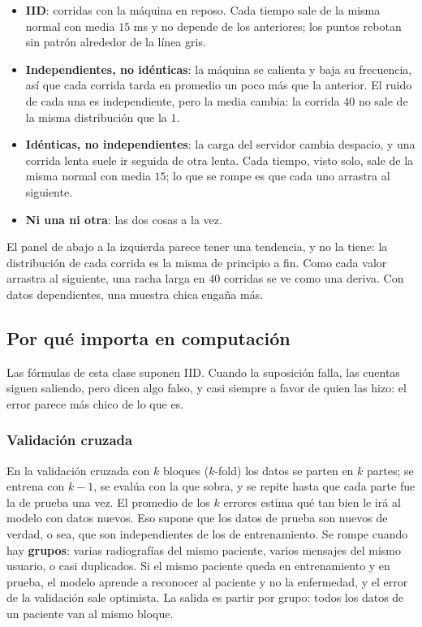 \documentclass[11pt,letterpaper]{article}
\begin{document}
\begin{itemize}[itemsep=0.3em]
    \item \textbf{IID}: corridas con la máquina en reposo. Cada tiempo
          sale de la misma normal con media $15$ ms y no depende de los
          anteriores; los puntos rebotan sin patrón alrededor de la
          línea gris.
    \item \textbf{Independientes, no idénticas}: la máquina se calienta
          y baja su frecuencia, así que cada corrida tarda en promedio
          un poco más que la anterior. El ruido de cada una es
          independiente, pero la media cambia: la corrida $40$ no sale
          de la misma distribución que la $1$.
    \item \textbf{Idénticas, no independientes}: la carga del servidor
          cambia despacio, y una corrida lenta suele ir seguida de otra
          lenta. Cada tiempo, visto solo, sale de la misma normal con
          media $15$; lo que se rompe es que cada uno arrastra al
          siguiente.
    \item \textbf{Ni una ni otra}: las dos cosas a la vez.
\end{itemize}

\begin{ojo}
    El panel de abajo a la izquierda parece tener una tendencia, y no
    la tiene: la distribución de cada corrida es la misma de principio
    a fin. Como cada valor arrastra al siguiente, una racha larga en
    $40$ corridas se ve como una deriva. Con datos dependientes, una
    muestra chica engaña más.
\end{ojo}


\subsection*{Por qué importa en computación}

Las fórmulas de esta clase suponen IID. Cuando la suposición falla,
las cuentas siguen saliendo, pero dicen algo falso, y casi siempre a
favor de quien las hizo: el error parece más chico de lo que es.

\subsubsection*{Validación cruzada}

En la validación cruzada con $k$ bloques ($k$-fold) los datos se parten
en $k$ partes; se entrena con $k - 1$, se evalúa con la que sobra, y se
repite hasta que cada parte fue la de prueba una vez. El promedio de
los $k$ errores estima qué tan bien le irá al modelo con datos nuevos.
Eso supone que los datos de prueba son nuevos de verdad, o sea, que
son independientes de los de entrenamiento. Se rompe cuando hay
\textbf{grupos}: varias radiografías del mismo paciente, varios
mensajes del mismo usuario, o casi duplicados. Si el mismo paciente
queda en entrenamiento y en prueba, el modelo aprende a reconocer al
paciente y no la enfermedad, y el error de la validación sale
optimista. La salida es partir por grupo: todos los datos de un
paciente van al mismo bloque.
\end{document}
